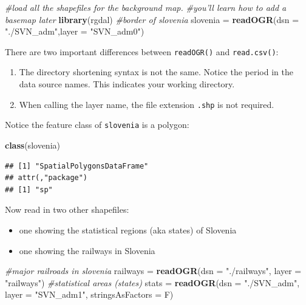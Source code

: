 \documentclass[]{book}
\newenvironment{Shaded}{\begin{snugshade}}{\end{snugshade}}
\newcommand{\CommentTok}[1]{\textcolor[rgb]{0.56,0.35,0.01}{\textit{#1}}}
\newcommand{\DataTypeTok}[1]{\textcolor[rgb]{0.13,0.29,0.53}{#1}}
\newcommand{\KeywordTok}[1]{\textcolor[rgb]{0.13,0.29,0.53}{\textbf{#1}}}
\newcommand{\NormalTok}[1]{#1}
\newcommand{\StringTok}[1]{\textcolor[rgb]{0.31,0.60,0.02}{#1}}
\providecommand{\tightlist}{%
  \setlength{\itemsep}{0pt}\setlength{\parskip}{0pt}}
\begin{document}
\begin{Shaded}
\begin{Highlighting}[]
\CommentTok{#load all the shapefiles for the background map. }
\CommentTok{#you'll learn how to add a basemap later}
\KeywordTok{library}\NormalTok{(rgdal)}
\CommentTok{#border of slovenia}
\NormalTok{slovenia =}\StringTok{ }\KeywordTok{readOGR}\NormalTok{(}\DataTypeTok{dsn =} \StringTok{"./SVN_adm"}\NormalTok{,}\DataTypeTok{layer =} \StringTok{"SVN_adm0"}\NormalTok{)}
\end{Highlighting}
\end{Shaded}

There are two important differences between \texttt{readOGR()} and \texttt{read.csv()}:

\begin{enumerate}
\def\labelenumi{\arabic{enumi}.}
\tightlist
\item
  The directory shortening syntax is not the same. Notice the period in the data source names. This indicates your working directory.
\item
  When calling the layer name, the file extension \texttt{.shp} is not required.
\end{enumerate}

Notice the feature class of \texttt{slovenia} is a polygon:

\begin{Shaded}
\begin{Highlighting}[]
\KeywordTok{class}\NormalTok{(slovenia)}
\end{Highlighting}
\end{Shaded}

\begin{verbatim}
## [1] "SpatialPolygonsDataFrame"
## attr(,"package")
## [1] "sp"
\end{verbatim}

Now read in two other shapefiles:

\begin{itemize}
\tightlist
\item
  one showing the statistical regions (aka states) of Slovenia \citep{svn-cite}
\item
  one showing the railways in Slovenia \citep{rail-cite}
\end{itemize}

\begin{Shaded}
\begin{Highlighting}[]
\CommentTok{#major railroads in slovenia}
\NormalTok{railways =}\StringTok{ }\KeywordTok{readOGR}\NormalTok{(}\DataTypeTok{dsn =} \StringTok{"./railways"}\NormalTok{,}
                   \DataTypeTok{layer =} \StringTok{"railways"}\NormalTok{) }
\CommentTok{#statistical areas (states)}
\NormalTok{stats =}\StringTok{ }\KeywordTok{readOGR}\NormalTok{(}\DataTypeTok{dsn =} \StringTok{"./SVN_adm"}\NormalTok{,}
                \DataTypeTok{layer =} \StringTok{"SVN_adm1"}\NormalTok{, }\DataTypeTok{stringsAsFactors =}\NormalTok{ F)  }
\end{Highlighting}
\end{Shaded}
\end{document}
